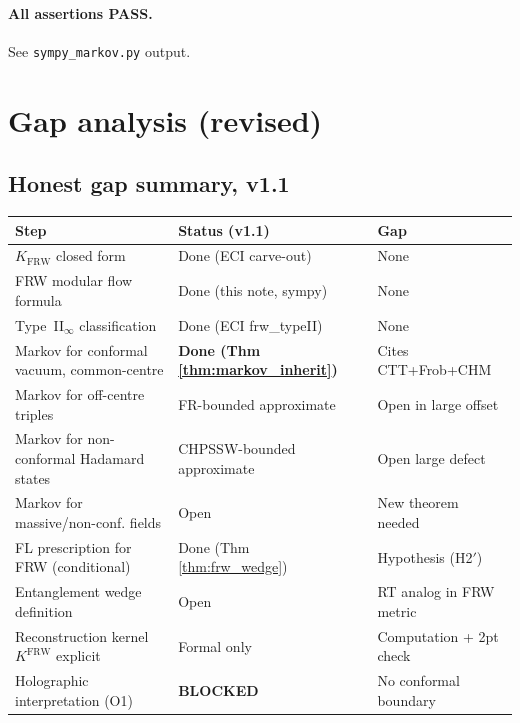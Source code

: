\documentclass[11pt,a4paper]{article}
\theoremstyle{remark}
\newcommand{\FRW}{{\mathrm{FRW}}}
\newcommand{\KFRW}{K_{\FRW}}
\begin{document}
\paragraph{All assertions PASS.}  See \texttt{sympy\_markov.py} output.

\section{Gap analysis (revised)}
\label{sec:gap}

\subsection{Honest gap summary, v1.1}

\begin{center}
\begin{tabular}{lll}
\hline
Step & Status (v1.1) & Gap \\
\hline
$\KFRW$ closed form & Done (ECI carve-out) & None \\
FRW modular flow formula & Done (this note, sympy) & None \\
Type~II$_\infty$ classification & Done (ECI frw\_typeII) & None \\
Markov for conformal vacuum, common-centre & \textbf{Done (Thm \ref{thm:markov_inherit})} & Cites CTT+Frob+CHM \\
Markov for off-centre triples & FR-bounded approximate & Open in large offset \\
Markov for non-conformal Hadamard states & CHPSSW-bounded approximate & Open large defect \\
Markov for massive/non-conf. fields & Open & New theorem needed \\
FL prescription for FRW (conditional) & Done (Thm \ref{thm:frw_wedge}) & Hypothesis (H2$'$) \\
Entanglement wedge definition & Open & RT analog in FRW metric \\
Reconstruction kernel $K^{\FRW}$ explicit & Formal only & Computation + 2pt check \\
Holographic interpretation (O1) & \textbf{BLOCKED} & No conformal boundary \\
\hline
\end{tabular}
\end{center}

\end{document}
